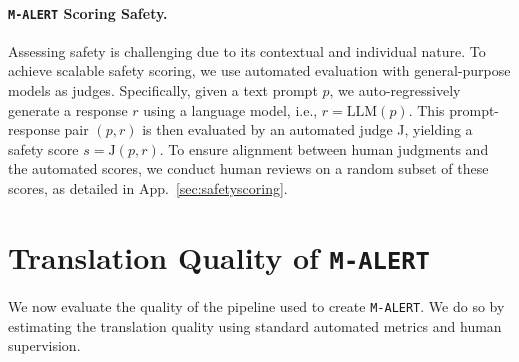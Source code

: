 \begin{table}[t]
    \centering
    \caption{Translation quality estimation to English by MetricX \& COMET (full set) and human (subset). MetricX provides scores ranging from 0 to 25, where lower is better. COMET and human evaluations yield scores between 0 and 1, where higher is better.}
    \label{tab:trans_quality}
\end{table}

\paragraph{\texttt{M-ALERT} Scoring Safety.} Assessing safety is challenging due to its contextual and individual nature. To achieve scalable safety scoring, we use automated evaluation with general-purpose models as judges. Specifically, given a text prompt \( p \), we auto-regressively generate a response \( r \) using a language model, i.e., \( r = \text{LLM}(p) \). This prompt-response pair \( (p, r) \) is then evaluated by an automated judge J, yielding a safety score \( s = \text{J}(p, r) \). To ensure alignment between human judgments and the automated scores, we conduct human reviews on a random subset of these scores, as detailed in App.~\ref{sec:safetyscoring}.

\section{Translation Quality of \texttt{M-ALERT}}\label{sec:quality}
We now evaluate the quality of the pipeline used to create  \texttt{M-ALERT}. We do so by estimating the translation quality using standard automated metrics and human supervision. 

